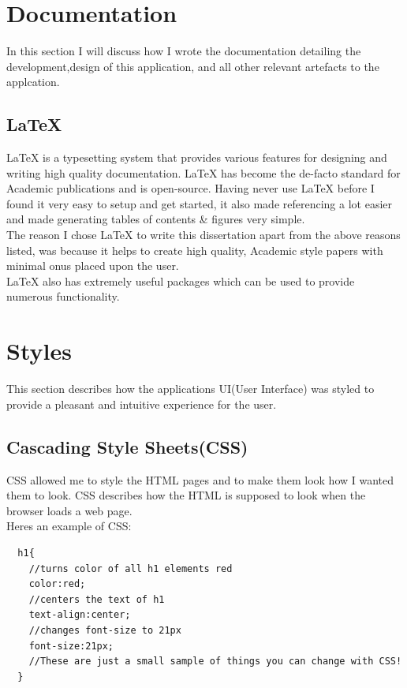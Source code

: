 \section{Documentation}
In this section I will discuss how I wrote the documentation detailing the development,design of this application, and all other relevant artefacts to the applcation.
\subsection{\LaTeX}
\LaTeX \hspace{0.1cm} is a typesetting system that provides various features for designing and writing high quality documentation\cite{Latex}.  \LaTeX\hspace{0.1cm} has become the de-facto standard for Academic publications and is open-source. Having never use \LaTeX\hspace{0.1cm} before I found it very easy to setup and get started, it also made referencing a lot easier and made generating tables of contents \& figures very simple.
\\
The reason I chose \LaTeX \hspace{0.1cm} to write this dissertation apart from the above reasons listed, was because it helps to create high quality, Academic style papers with minimal onus placed upon the user.
\\
\LaTeX \hspace{0.1cm} also has extremely useful packages which can be used to provide numerous functionality.
\section{Styles}
This section describes how the applications UI(User Interface) was styled to provide a pleasant and intuitive experience for the user.
\subsection{Cascading Style Sheets(CSS)}
CSS allowed me to style the HTML pages and to make them look how I wanted them to look.  CSS describes how the HTML is supposed to look when the browser loads a web page.
\\
Heres an example of CSS:
\begin{verbatim}
  h1{
    //turns color of all h1 elements red
    color:red;
    //centers the text of h1
    text-align:center;
    //changes font-size to 21px
    font-size:21px;
    //These are just a small sample of things you can change with CSS!
  }
\end{verbatim}

